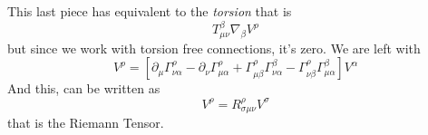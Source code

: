 This last piece has equivalent to the \emph{torsion} that is
\[
T^{\beta }_{\mu \nu }\nabla _{\beta }V^{\rho }
\]
but since we work with torsion free connections, it's zero. We are left with
\begin{equation}
	[\nabla _{\mu }, \nabla _{\nu }]V^{\rho } = [\partial_{\mu }\Gamma ^{\rho }_{\nu \alpha } - \partial_{\nu }\Gamma ^{\rho }_{\mu \alpha } + \Gamma  ^{\rho }_{\mu  \beta }\Gamma  ^{ \beta }_{\nu  \alpha } - \Gamma ^{\rho }_{\nu \beta }\Gamma ^{\beta }_{\mu \alpha }] V^{\alpha }
\end{equation}
And this, can be written as 
\begin{equation}
	[\nabla _{\mu }, \nabla _{\nu }] V^{ \rho } = R^{\rho }_{\sigma \mu \nu } V^{\sigma }
\end{equation}
that is the Riemann Tensor.






